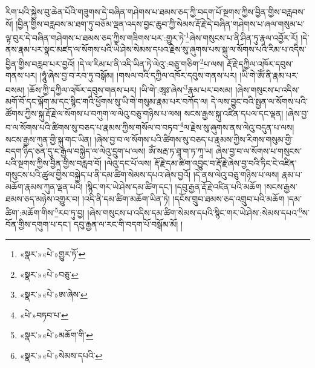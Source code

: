 རིག་པའི་སྐྱེས་བུ་ཆེན་པོའི་གཟུགས་དེ་བཞིན་གཤེགས་པ་ཐམས་ཅད་ཀྱི་བདག་པོ་སྔགས་ཀྱིས་བྱིན་གྱིས་བརླབས་སོ། །བྱིན་གྱིས་བརླབས་མ་ཐག་ཏུ་བཅོམ་ལྡན་འདས་བྱང་ཆུབ་ཀྱི་སེམས་རྡོ་རྗེ་དེ་བཞིན་གཤེགས་པ་ཞལ་གསུམ་པ་ལྟ་བུར་དེ་བཞིན་གཤེགས་པ་ཐམས་ཅད་ཀྱིས་གཟིགས་པར་:གྱུར་ཏེ་\footnote{«སྣར་»«པེ་»གྱུར་ཏོ་}ཞེས་གསུངས་པ་ནི་ཤིན་ཏུ་རྣལ་འབྱོར་རོ། །དེ་ནས་རྣམ་པར་སྣང་མཛད་ལ་སོགས་པའི་ཡེ་ཤེས་སེམས་དཔའ་རྗེས་སུ་ཞུགས་པས་སྐུ་ལ་སོགས་པའི་རིམ་པ་འདིས་བྱིན་གྱིས་བརླབ་པར་བྱའོ། །དེ་ལ་རིམ་པ་ནི་འདི་ཡིན་ཏེ་ལེའུ་:བཅུ་གཅིག་\footnote{«སྣར་»«པེ་»བཅུ་}པ་ལས། རྡོ་རྗེ་དཀྱིལ་འཁོར་དབུས་གནས་པར། །ཧཱུཾ་ཞེས་བྱ་བ་རབ་ཏུ་བསྒོམ། །གསལ་བའི་དཀྱིལ་འཁོར་དབུས་གནས་པར། །ཡི་གེ་ཨོཾ་ནི་རྣམ་པར་བསམ། །ཆོས་ཀྱི་དཀྱིལ་འཁོར་དབུས་གནས་པར། །ཡི་གེ་:ཨཱཿ་ཞེས་\footnote{«སྣར་»«པེ་»ཨ་ཞེས་}རྣམ་པར་བསམ། །ཞེས་གསུངས་པ་འདིས་མགོ་བོ་དང་ལྐོག་མ་དང་སྙིང་གའི་ཕྱོགས་སུ་ཡི་གེ་གསུམ་རྣམ་པར་བཀོད་ལ། དེ་ལས་བྱུང་བའི་སྤྱན་ལ་སོགས་པའི་ཚོགས་ཀྱིས་སྐུ་རྡོ་རྗེ་ལ་སོགས་པ་བཀུག་ལ་ལེའུ་བཅུ་གཉིས་པ་ལས། སངས་རྒྱས་སྐུ་འཛིན་དཔལ་དང་ལྡན། །ཞེས་བྱ་བ་ལ་སོགས་པའི་ཚིགས་སུ་བཅད་པ་རྣམས་ཀྱིས་གསོལ་བ་བཏབ་\footnote{«པེ་»བཏབ་པ་}ལ་རྗེས་སུ་ཞུགས་ནས་ལེའུ་བདུན་པ་ལས། སངས་རྒྱས་ཀུན་གྱི་སྐུ་གང་ཡིན། །ཞེས་བྱ་བ་ལ་སོགས་པའི་ཚིགས་སུ་བཅད་པ་རྣམས་ཀྱིས་རིགས་གསུམ་གྱི་བདག་ཉིད་ཅན་དུ་ང་རྒྱལ་བསྐྱེད་ལ་ལེའུ་དྲུག་པ་ལས། ཨོཾ་སརྦ་ཏ་ཐཱ་ག་ཏ་ཀཱ་ཡ། ཞེས་བྱ་བ་ལ་སོགས་པ་གསུངས་པའི་སྔགས་ཀྱིས་བྱིན་གྱིས་བརླབ་བོ། །ལེའུ་དང་པོ་ལས། རྡོ་རྗེ་དམ་ཚིག་འབྱུང་བ་རྡོ་རྗེ་ཞེས་བྱ་བའི་ཏིང་ངེ་འཛིན་གསུངས་པའི་ཚུལ་གྱིས་བསྐྱེད་པ་ནི་དམ་ཚིག་སེམས་དཔའ་ཞེས་བྱའོ། །དེ་ནས་ལེའུ་བཅུ་གཉིས་པ་ལས། རྣམ་པ་མཆོག་རྣམས་ཀུན་ལྡན་པའི། །སྙིང་གར་ཡེ་ཤེས་དམ་ཚིག་དང་། །དབུ་རྒྱན་རྡོ་རྗེ་འཛིན་པའི་མཆོག །སངས་རྒྱས་ཐམས་ཅད་མཉེས་འགྱུར་བ། །འདི་ནི་དམ་ཚིག་མཆོག་ཡིན་ཏེ། །དངོས་གྲུབ་ཐམས་ཅད་འགྲུབ་པའི་མཆོག །དམ་ཚིག་:མཆོག་གིས་\footnote{«སྣར་»«པེ་»མཆོག་གི་}རབ་ཏུ་བྱ། །ཞེས་གསུངས་པ་འདིས་དམ་ཚིག་སེམས་དཔའི་སྙིང་གར་ཡེ་ཤེས་:སེམས་དཔའ་\footnote{«སྣར་»«པེ་»སེམས་དཔའི་}ས་བོན་གྱིས་དགུག་པ་དང་། དབུ་རྒྱན་ལ་རང་གི་བདག་པོ་བསྒོམ་མོ། །
